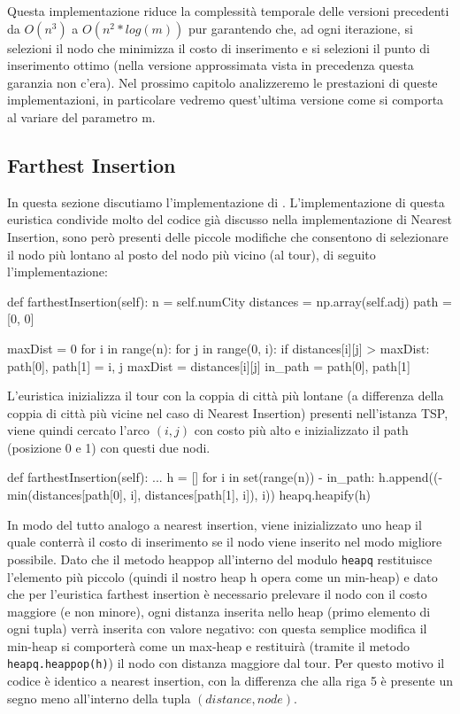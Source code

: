 \documentclass[a4paper,12pt]{report}
\begin{document}
Questa implementazione riduce la complessità temporale delle versioni precedenti da $O(n^3)$ a $O(n^2 * log(m))$ pur garantendo che, ad ogni iterazione, si selezioni il nodo che minimizza il costo di inserimento e si selezioni il punto di inserimento ottimo (nella versione approssimata vista in precedenza questa garanzia non c'era). \newline
Nel prossimo capitolo analizzeremo le prestazioni di queste implementazioni, in particolare vedremo quest'ultima versione come si comporta al variare del parametro m.


\subsection{Farthest Insertion}
In questa sezione discutiamo l'implementazione di . L'implementazione di questa euristica condivide molto del codice già discusso nella implementazione di Nearest Insertion, sono però presenti delle piccole modifiche che consentono di selezionare il nodo più lontano al posto del nodo più vicino (al tour), di seguito l'implementazione:
\begin{python}
  def farthestInsertion(self):
    n = self.numCity
    distances = np.array(self.adj)
    path = [0, 0]
  
    maxDist = 0
      for i in range(n):
        for j in range(0, i):
          if distances[i][j] > maxDist:
            path[0], path[1] = i, j
            maxDist = distances[i][j]
      in_path = {path[0], path[1]}
  \end{python}
  L'euristica inizializza il tour con la coppia di città più lontane (a differenza della coppia di città più vicine nel caso di Nearest Insertion) presenti nell'istanza TSP, viene quindi cercato l'arco $(i, j)$ con costo più alto e inizializzato il path (posizione 0 e 1) con questi due nodi.
  \begin{python}
  def farthestInsertion(self):
    ...
    h = []
    for i in set(range(n)) - in_path:
      h.append((-min(distances[path[0], i], distances[path[1], i]), i))
    heapq.heapify(h)
  \end{python}
In modo del tutto analogo a nearest insertion, viene inizializzato uno heap il quale conterrà il costo di inserimento se il nodo viene inserito nel modo migliore possibile. Dato che il metodo heappop all'interno del modulo \lstinline!heapq! restituisce l'elemento più piccolo (quindi il nostro heap h opera come un min-heap) e dato che per l'euristica farthest insertion è necessario prelevare il nodo con il costo maggiore (e non minore), ogni distanza inserita nello heap (primo elemento di ogni tupla) verrà inserita con valore negativo: con questa semplice modifica il min-heap si comporterà come un max-heap e restituirà (tramite il metodo \lstinline!heapq.heappop(h)!) il nodo con distanza maggiore dal tour. Per questo motivo il codice è identico a nearest insertion, con la differenza che alla riga 5 è presente un segno meno all'interno della tupla $(distance, node)$.
\end{document}
